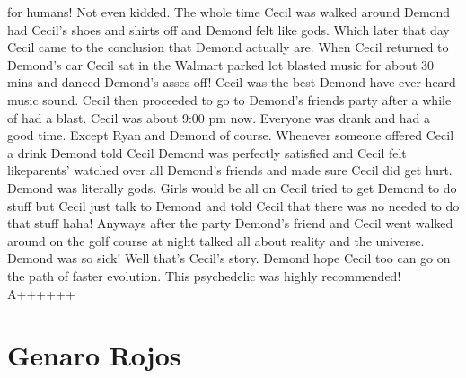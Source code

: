\documentclass[12pt]{book}
\begin{document}
for humans! Not even kidded. The whole time Cecil was walked around Demond had Cecil's shoes and shirts off and Demond felt like gods. Which later that day Cecil came to the conclusion that Demond actually are. When Cecil returned to Demond's car Cecil sat in the Walmart parked lot blasted music for about 30 mins and danced Demond's asses off! Cecil was the best Demond have ever heard music sound. Cecil then proceeded to go to Demond's friends party after a while of had a blast. Cecil was about 9:00 pm now. Everyone was drank and had a good time. Except Ryan and Demond of course. Whenever someone offered Cecil a drink Demond told Cecil Demond was perfectly satisfied and Cecil felt likeparents' watched over all Demond's friends and made sure Cecil did get hurt. Demond was literally gods. Girls would be all on Cecil tried to get Demond to do stuff but Cecil just talk to Demond and told Cecil that there was no needed to do that stuff haha! Anyways after the party Demond's friend and Cecil went walked around on the golf course at night talked all about reality and the universe. Demond was so sick! Well that's Cecil's story. Demond hope Cecil too can go on the path of faster evolution. This psychedelic was highly recommended! A++++++



\chapter{Genaro Rojos}
\end{document}
